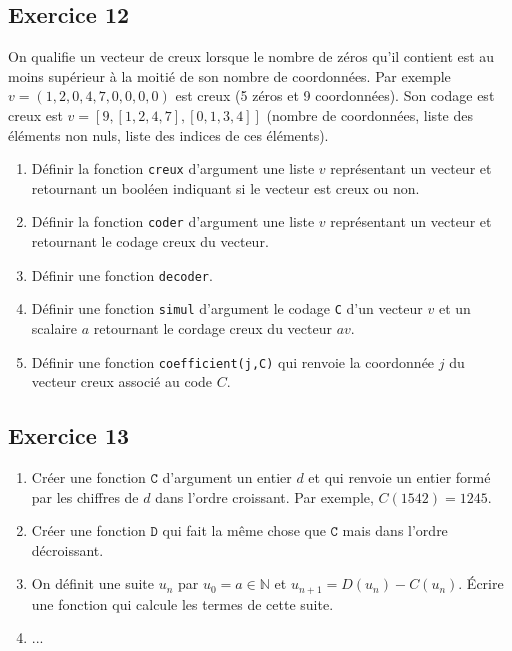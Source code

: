 \documentclass[10pt,fleqn]{article} %
\begin{document}
\begin{multicols}{2}
\subsection*{Exercice 12}
On qualifie un vecteur de creux lorsque le nombre de zéros qu'il contient est au moins supérieur à la moitié de son nombre de coordonnées. Par exemple $v=\left(1,2,0,4,7,0,0,0,0\right)$ est creux (5 zéros et 9 coordonnées). Son codage est creux est $v=\left[9,[1,2,4,7],[0,1,3,4]\right]$ (nombre de coordonnées, liste des éléments non nuls, liste des indices de ces éléments).
\begin{enumerate}
\item Définir la fonction \texttt{creux} d'argument une liste $v$ représentant un vecteur et retournant un booléen indiquant si le vecteur est creux ou non.
\item Définir la fonction \texttt{coder} d'argument une liste $v$ représentant un vecteur et retournant le codage creux du vecteur.
\item Définir une fonction \texttt{decoder}.
\item Définir une fonction \texttt{simul} d'argument le codage \texttt{C} d'un vecteur $v$ et un scalaire $a$ retournant le cordage creux du vecteur $av$.
\item Définir une fonction \texttt{coefficient(j,C)} qui renvoie la coordonnée $j$ du vecteur creux associé au code $C$.
\end{enumerate}

\subsection*{Exercice 13}
\begin{enumerate}
\item Créer une fonction $\texttt{C}$ d'argument un entier $d$ et qui renvoie un entier formé par les chiffres de $d$ dans l'ordre croissant. Par exemple, $C(1542)=1245$.
\item Créer une fonction $\texttt{D}$ qui fait la même chose que $\texttt{C}$ mais dans l'ordre décroissant. 
\item On définit une suite $u_n$ par $u_0=a \in \mathbb{N}$ et $u_{n+1}=D(u_n)-C(u_n)$. Écrire une fonction qui calcule les termes de cette suite.
\item ...
\end{enumerate}


\end{multicols}
\end{document}
